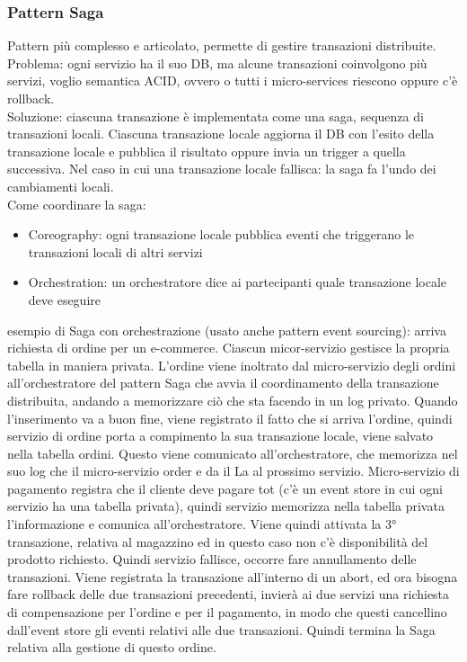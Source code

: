 \documentclass{article}
\begin{document}
\subsubsection{Pattern Saga}
Pattern più complesso e articolato, permette di gestire transazioni distribuite. Problema: ogni servizio ha il suo DB, ma alcune transazioni coinvolgono più servizi, voglio semantica ACID, ovvero o tutti i micro-services riescono oppure c'è rollback.\\ Soluzione: ciascuna transazione è implementata come una saga, sequenza di transazioni locali. Ciascuna transazione locale aggiorna il DB con l'esito della transazione locale e pubblica il risultato oppure invia un trigger a quella successiva. Nel caso in cui una transazione locale fallisca: la saga fa l'undo dei cambiamenti locali.\\ Come coordinare la saga:
\begin{itemize}
\item Coreography: ogni transazione locale pubblica eventi che triggerano le transazioni locali di altri servizi
\item Orchestration: un orchestratore dice ai partecipanti quale transazione locale deve eseguire
\end{itemize}
esempio di Saga con orchestrazione (usato anche pattern event sourcing): arriva richiesta di ordine per un e-commerce. Ciascun micor-servizio gestisce la propria tabella in maniera privata. L'ordine viene inoltrato dal micro-servizio degli ordini all'orchestratore del pattern Saga che avvia il coordinamento della transazione distribuita, andando a memorizzare ciò che sta facendo in un log privato. Quando l'inserimento va a buon fine, viene registrato il fatto che si arriva l'ordine, quindi servizio di ordine porta a compimento la sua transazione locale, viene salvato nella tabella ordini. Questo viene comunicato all'orchestratore, che memorizza nel suo log che il micro-servizio order e da il La al prossimo servizio. Micro-servizio di pagamento registra che il cliente deve pagare tot (c'è un event store in cui ogni servizio ha una tabella privata), quindi servizio memorizza nella tabella privata l'informazione e comunica all'orchestratore. Viene quindi attivata la 3° transazione, relativa al magazzino ed in questo caso non c'è disponibilità del prodotto richiesto. Quindi servizio fallisce, occorre fare annullamento delle transazioni. Viene registrata la transazione all'interno di un abort, ed ora bisogna fare rollback delle due transazioni precedenti, invierà ai due servizi una richiesta di compensazione per l'ordine e per il pagamento, in modo che questi cancellino dall'event store gli eventi relativi alle due transazioni. Quindi termina la Saga relativa alla gestione di questo ordine.
\end{document}
